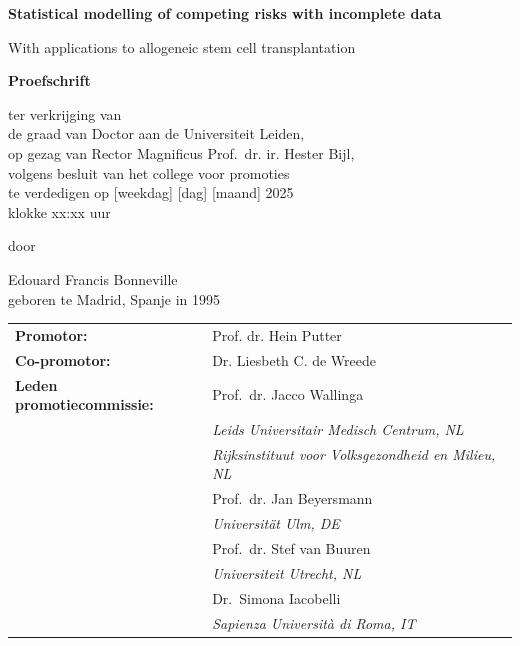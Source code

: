 \documentclass[
  letterpaper,
  paper=240mm:170mm,
  twoside=true,
  open=right,
  fontsize=10pt,
  pagesize=false,
  BCOR=15mm,
  DIV=14,
  headinclude=true,
  footinclude=false,
  headsepline=on]{scrbook}
\newcommand{\bsf}[1]{\textbf{\textsf{#1}}}
\begin{document}
\begin{center}
  \bsf{\huge Statistical modelling of competing risks with incomplete
data} \par %
  \smallskip
  \textsf{\Large With applications to allogeneic stem cell
transplantation} \par
  \vfill
  \textbf{\large Proefschrift} \par
  \vspace{2\baselineskip}
  \large{
    ter verkrijging van \\
    de graad van Doctor aan de Universiteit Leiden, \\
    op gezag van Rector Magnificus Prof.~dr. ir. Hester Bijl, \\
    volgens besluit van het college voor promoties \\
    te verdedigen op {[}weekdag{]} {[}dag{]} {[}maand{]} 2025  \\
    klokke xx:xx uur
  } \par
  \vspace{2\baselineskip}
  \large{door} \par
  \vspace{2\baselineskip}
  \large{Edouard Francis Bonneville} \\
  \normalsize{geboren te Madrid, Spanje in 1995} \par
\end{center}


\clearpage
\thispagestyle{empty}

\noindent\begin{tabular}{p{14em} l}
    \normalsize\bsf{Promotor:} & \normalsize Prof. dr. Hein Putter \\
    \rule{0pt}{4ex}\normalsize\bsf{Co-promotor:} & \normalsize Dr. Liesbeth C. de Wreede \\
    \normalsize
    \rule{0pt}{8ex}\bsf{Leden promotiecommissie:}
     &
      \rule{0pt}{4ex}\normalsize Prof.~dr. Jacco Wallinga
       \\[0.2mm] &
        \indent\textit{Leids Universitair Medisch Centrum, NL}
       \\[0.2mm] &
        \indent\textit{Rijksinstituut voor Volksgezondheid en Milieu,
NL}
       \\
     &
      \rule{0pt}{4ex}\normalsize Prof.~dr. Jan Beyersmann
       \\[0.2mm] &
        \indent\textit{Universität Ulm, DE}
       \\
     &
      \rule{0pt}{4ex}\normalsize Prof.~dr. Stef van Buuren
       \\[0.2mm] &
        \indent\textit{Universiteit Utrecht, NL}
       \\
     &
      \rule{0pt}{4ex}\normalsize Dr.~Simona Iacobelli
       \\[0.2mm] &
        \indent\textit{Sapienza Università di Roma, IT}
       \\
    
\end{tabular}
\end{document}
